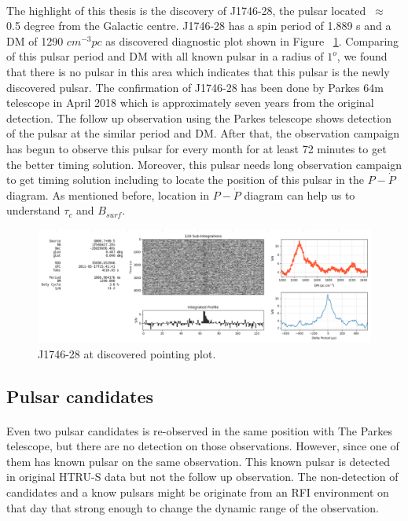 \documentclass[thesis_msc.tex]{subfiles}
\begin{document}
    \paragraph{} The highlight of this thesis is the discovery of J1746-28, the pulsar located $~\approx$ 0.5 degree from the Galactic centre. J1746-28 has a spin period of 1.889 s and a DM of 1290 $cm^{-3}pc$ as discovered diagnostic plot shown in Figure ~\ref{J1746}.  Comparing of this pulsar period and DM with all known pulsar in a radius of $1^o$, we found that there is no pulsar in this area which indicates that this pulsar is the newly discovered pulsar. The confirmation of J1746-28 has been done by Parkes 64m telescope in April 2018 which is approximately seven years from the original detection. The follow up observation using the Parkes telescope shows detection of the pulsar at the similar period and DM. After that, the observation campaign has begun to observe this pulsar for every month for at least 72 minutes to get the better timing solution. Moreover, this pulsar needs long observation campaign to get timing solution including to locate the position of this pulsar in the $P-\dot{P}$ diagram. As mentioned before, location in $P-\dot{P}$ diagram can help us to understand $\tau_c$ and $B_{surf}$. 
    \begin{figure}[h]
\centering
\includegraphics[width=1.0\textwidth]{figures/J1746-28_D.png}
\caption{J1746-28 at discovered pointing plot.}\label{J1746}
\end{figure}
      \subsection{Pulsar candidates}
      \paragraph{} Even two pulsar candidates is re-observed in the same position with The Parkes telescope, but there are no detection on those observations. However, since one of them has known pulsar on the same observation. This known pulsar is detected in original HTRU-S data but not the follow up observation. The non-detection of candidates and a know pulsars  might be originate from an RFI environment on that day that strong enough to change the dynamic range of the observation.
     
\end{document}
